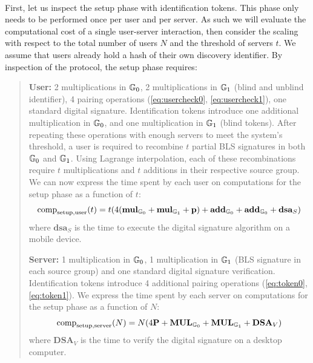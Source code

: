 	\paragraph{} First, let us inspect the setup phase with identification tokens. This phase only needs to be performed once per user and per server. As such we will evaluate the computational cost of a single user-server interaction, then consider the scaling with respect to the total number of users $N$ and the threshold of servers $t$. We assume that users already hold a hash of their own discovery identifier. By inspection of the protocol, the setup phase requires: 
	\begin{quote}
		\textbf{User:} 2 multiplications in $\mathbb{G}_0$, 2 multiplications in $\mathbb{G}_1$ (blind and unblind identifier), 4 pairing operations (\autoref{eq:usercheck0}, \autoref{eq:usercheck1}), one standard digital signature. Identification tokens introduce one additional multiplication in $\mathbb{G}_0$, and one multiplication in $\mathbb{G}_1$ (blind tokens). After repeating these operations with enough servers to meet the system's threshold, a user is required to recombine $t$ partial BLS signatures in both $\mathbb{G}_0$ and $\mathbb{G}_1$. Using Lagrange interpolation, each of these recombinations require $t$ multiplications and $t$ additions in their respective source group. We can now express the time spent by each user on computations for the setup phase as a function of $t$:
		\begin{equation}
			\mathrm{comp}_{\mathrm{setup, user}}(t) = t(4(\mathbf{mul}_{\mathbb{G}_0} + \mathbf{mul}_{\mathbb{G}_1} + \mathbf{p}) + \mathbf{add}_{\mathbb{G}_0} + \mathbf{add}_{\mathbb{G}_0} + \mathbf{dsa}_S)
		\end{equation}
		\noindent where $\mathbf{dsa}_S$ is the time to execute the digital signature algorithm on a mobile device.
		
				
		\textbf{Server:} 1 multiplication in $\mathbb{G}_0$, 1 multiplication in $\mathbb{G}_1$ (BLS signature in each source group) and one standard digital signature verification. Identification tokens introduce 4 additional pairing operations (\autoref{eq:token0}, \autoref{eq:token1}). We express the time spent by each server on computations for the setup phase as a function of $N$:
		\begin{equation}
			\mathrm{comp}_{\mathrm{setup, server}}(N) = N(4\mathbf{P} + \mathbf{MUL}_{\mathbb{G}_0} + \mathbf{MUL}_{\mathbb{G}_1} + \mathbf{DSA}_V)
		\end{equation}
		\noindent where $\mathbf{DSA}_V$ is the time to verify the digital signature on a desktop computer.
	\end{quote}
	

